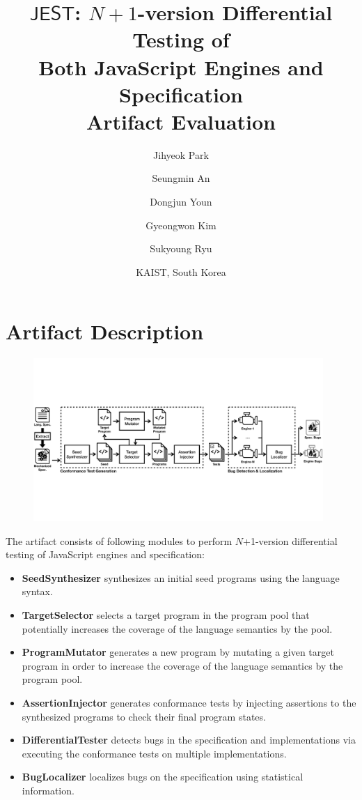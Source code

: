\documentclass{article}
\begin{document}
\title{$\textsf{JEST}$: $N\!+\!1$-version Differential Testing of\\ Both JavaScript Engines and Specification
\\ {\large Artifact Evaluation}}

\author{
  Jihyeok Park
  \and
  Seungmin An
  \and
  Dongjun Youn
  \and
  Gyeongwon Kim
  \and
  Sukyoung Ryu
}
\date{KAIST, South Korea}

\maketitle

\section{Artifact Description}

\begin{figure}[H]
  \includegraphics[width=0.98\textwidth]{overall.pdf}
\end{figure}

The artifact consists of following modules to perform $N$+1-version differential
testing of JavaScript engines and specification:
\begin{itemize}
  \item \textbf{SeedSynthesizer} synthesizes an initial seed programs using
    the language syntax.
  \item \textbf{TargetSelector} selects a target program in the program
    pool that potentially increases the coverage of the language semantics by
    the pool.
  \item \textbf{ProgramMutator} generates a new program by mutating a given
    target program in order to increase the coverage of the language semantics
    by the program pool.
  \item \textbf{AssertionInjector} generates conformance tests by injecting
    assertions to the synthesized programs to check their final program states.
  \item \textbf{DifferentialTester} detects bugs in the specification and
    implementations via executing the conformance tests on multiple
    implementations.
  \item \textbf{BugLocalizer} localizes bugs on the specification using
    statistical information.
\end{itemize}
\end{document}
